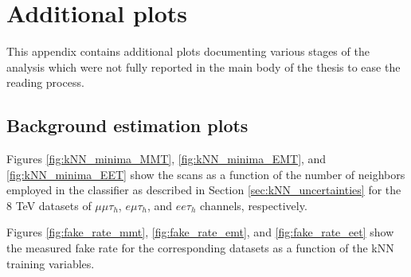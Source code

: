 \chapter{Additional plots}

This appendix contains additional plots documenting various stages of the analysis which were not fully reported in the main body of the thesis to ease the reading process. 

\section{Background estimation plots}

Figures \ref{fig:kNN_minima_MMT}, \ref{fig:kNN_minima_EMT}, and \ref{fig:kNN_minima_EET} show the \chisq scans as a function of the number of neighbors employed in the classifier as described in Section \ref{sec:kNN_uncertainties} for the 8 TeV datasets of $\mu\mu\tau_h$, $e\mu\tau_h$, and $ee\tau_h$ channels, respectively. 

Figures \ref{fig:fake_rate_mmt}, \ref{fig:fake_rate_emt}, and \ref{fig:fake_rate_eet} show the measured fake rate for the corresponding datasets as a function of the kNN training variables.

